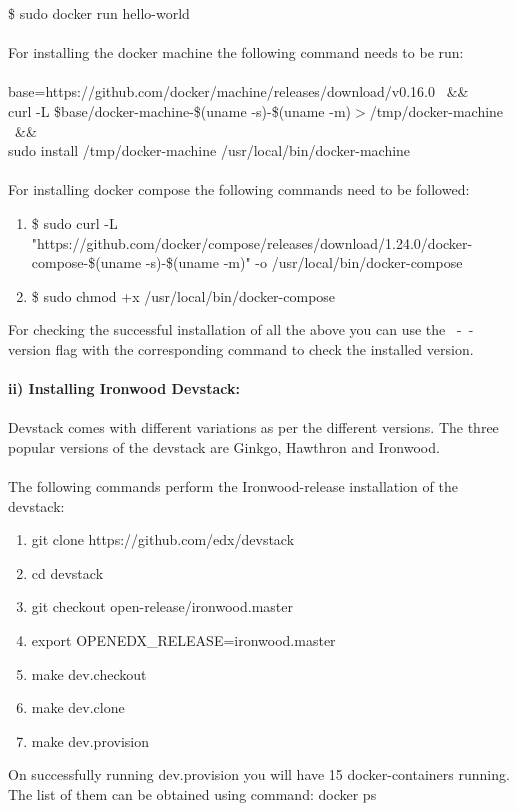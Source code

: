 \documentclass[12pt]{article}
\begin{document}
	\$ sudo docker run hello-world\\\\
	For installing the docker machine the following command needs to be run:\\ \\
	base=https://github.com/docker/machine/releases/download/v0.16.0 \ \&\& \\
	curl -L \$base/docker-machine-\$(uname -s)-\$(uname -m)$>$/tmp/docker-machine \ \&\& \\
	sudo install /tmp/docker-machine /usr/local/bin/docker-machine\\ \\
	For installing docker compose the following commands need to be followed:
	\begin{enumerate}
		\item \$ sudo curl -L "https://github.com/docker/compose/releases/download/1.24.0/docker-compose-\$(uname -s)-\$(uname -m)" -o /usr/local/bin/docker-compose
		\item \$ sudo chmod +x /usr/local/bin/docker-compose
	\end{enumerate}
	For checking the successful installation of all the above you can use the \ -\ -version flag with the corresponding command to check the installed version.\\\\
	\textbf{ii) Installing Ironwood Devstack:} \\ \\
	Devstack comes with different variations as per the different versions. The three popular versions of the devstack are Ginkgo, Hawthron and Ironwood. \\\\
	The following commands perform the Ironwood-release installation of the devstack:
	\begin{enumerate}
		\item git clone https://github.com/edx/devstack
		\item cd devstack
		\item git checkout open-release/ironwood.master
		\item export OPENEDX\_RELEASE=ironwood.master
		\item make dev.checkout
		\item make dev.clone
		\item make dev.provision
	\end{enumerate}
	On successfully running dev.provision you will have 15 docker-containers running. The list of them can be obtained using command:  docker ps
\end{document}
